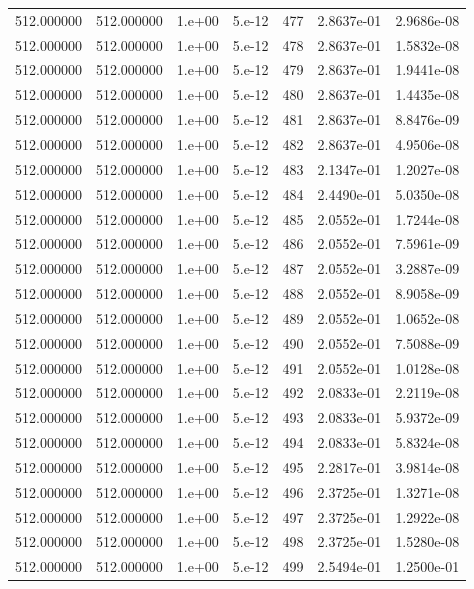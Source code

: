 \begin{table}[htbp]
\begin{tabular}{rrrrrrr}
512.000000 & 512.000000 & 1.e+00 & 5.e-12 & 477 & 2.8637e-01 & 2.9686e-08 \\
512.000000 & 512.000000 & 1.e+00 & 5.e-12 & 478 & 2.8637e-01 & 1.5832e-08 \\
512.000000 & 512.000000 & 1.e+00 & 5.e-12 & 479 & 2.8637e-01 & 1.9441e-08 \\
512.000000 & 512.000000 & 1.e+00 & 5.e-12 & 480 & 2.8637e-01 & 1.4435e-08 \\
512.000000 & 512.000000 & 1.e+00 & 5.e-12 & 481 & 2.8637e-01 & 8.8476e-09 \\
512.000000 & 512.000000 & 1.e+00 & 5.e-12 & 482 & 2.8637e-01 & 4.9506e-08 \\
512.000000 & 512.000000 & 1.e+00 & 5.e-12 & 483 & 2.1347e-01 & 1.2027e-08 \\
512.000000 & 512.000000 & 1.e+00 & 5.e-12 & 484 & 2.4490e-01 & 5.0350e-08 \\
512.000000 & 512.000000 & 1.e+00 & 5.e-12 & 485 & 2.0552e-01 & 1.7244e-08 \\
512.000000 & 512.000000 & 1.e+00 & 5.e-12 & 486 & 2.0552e-01 & 7.5961e-09 \\
512.000000 & 512.000000 & 1.e+00 & 5.e-12 & 487 & 2.0552e-01 & 3.2887e-09 \\
512.000000 & 512.000000 & 1.e+00 & 5.e-12 & 488 & 2.0552e-01 & 8.9058e-09 \\
512.000000 & 512.000000 & 1.e+00 & 5.e-12 & 489 & 2.0552e-01 & 1.0652e-08 \\
512.000000 & 512.000000 & 1.e+00 & 5.e-12 & 490 & 2.0552e-01 & 7.5088e-09 \\
512.000000 & 512.000000 & 1.e+00 & 5.e-12 & 491 & 2.0552e-01 & 1.0128e-08 \\
512.000000 & 512.000000 & 1.e+00 & 5.e-12 & 492 & 2.0833e-01 & 2.2119e-08 \\
512.000000 & 512.000000 & 1.e+00 & 5.e-12 & 493 & 2.0833e-01 & 5.9372e-09 \\
512.000000 & 512.000000 & 1.e+00 & 5.e-12 & 494 & 2.0833e-01 & 5.8324e-08 \\
512.000000 & 512.000000 & 1.e+00 & 5.e-12 & 495 & 2.2817e-01 & 3.9814e-08 \\
512.000000 & 512.000000 & 1.e+00 & 5.e-12 & 496 & 2.3725e-01 & 1.3271e-08 \\
512.000000 & 512.000000 & 1.e+00 & 5.e-12 & 497 & 2.3725e-01 & 1.2922e-08 \\
512.000000 & 512.000000 & 1.e+00 & 5.e-12 & 498 & 2.3725e-01 & 1.5280e-08 \\
512.000000 & 512.000000 & 1.e+00 & 5.e-12 & 499 & 2.5494e-01 & 1.2500e-01 \\

\end{tabular}
\end{table}
